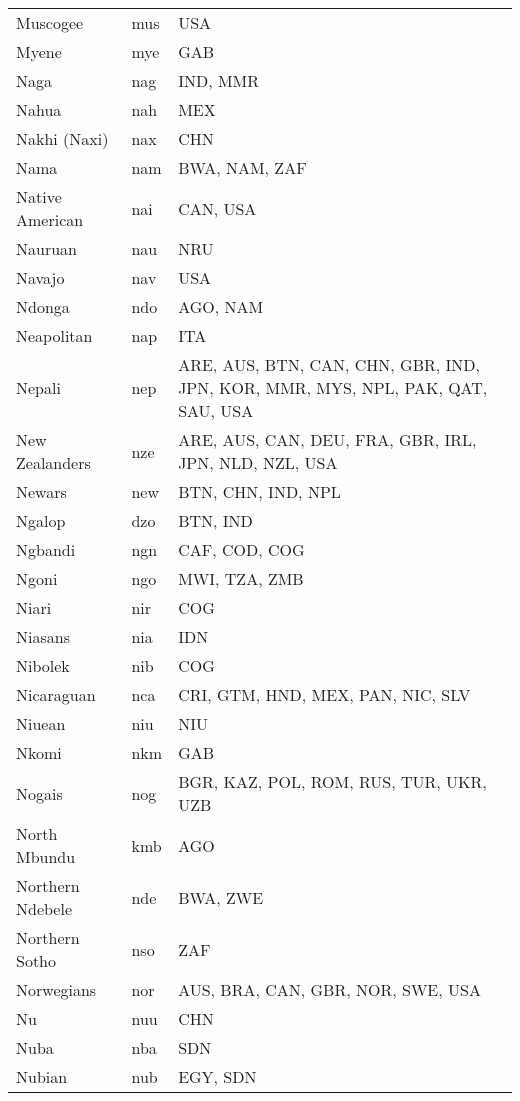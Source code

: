 \documentclass[12pt]{article}
\begin{document}
\begin{center}
\begin{longtable}{|p{7cm}|p{1cm}|p{7cm}|}
Muscogee	&	mus 	&	USA	\\	\cline{1-3}
Myene	&	mye	&	GAB	\\	\cline{1-3}
Naga	&	nag	&	IND, MMR	\\	\cline{1-3}
Nahua	&	nah 	&	MEX	\\	\cline{1-3}
Nakhi (Naxi)	&	nax	&	CHN	\\	\cline{1-3}
Nama	&	nam	&	BWA, NAM, ZAF	\\	\cline{1-3}
Native American	&	nai	&	CAN, USA	\\	\cline{1-3}
Nauruan	&	nau 	&	NRU	\\	\cline{1-3}
Navajo	&	nav 	&	USA	\\	\cline{1-3}
Ndonga	&	ndo 	&	AGO, NAM	\\	\cline{1-3}
Neapolitan	&	nap 	&	ITA	\\	\cline{1-3}
Nepali	&	nep 	&	ARE, AUS, BTN, CAN, CHN, GBR, IND, JPN, KOR, MMR, MYS, NPL, PAK, QAT, SAU, USA	\\	\cline{1-3}
New Zealanders	&	nze	&	ARE, AUS, CAN, DEU, FRA, GBR, IRL, JPN, NLD, NZL, USA	\\	\cline{1-3}
Newars	&	new 	&	BTN, CHN, IND, NPL	\\	\cline{1-3}
Ngalop	&	dzo 	&	BTN, IND	\\	\cline{1-3}
Ngbandi	&	ngn	&	CAF, COD, COG	\\	\cline{1-3}
Ngoni	&	ngo	&	MWI, TZA, ZMB	\\	\cline{1-3}
Niari	&	nir	&	COG	\\	\cline{1-3}
Niasans	&	nia 	&	IDN	\\	\cline{1-3}
Nibolek	&	nib	&	COG	\\	\cline{1-3}
Nicaraguan	&	nca	&	CRI, GTM, HND, MEX, PAN, NIC, SLV	\\	\cline{1-3}
Niuean	&	niu 	&	NIU	\\	\cline{1-3}
Nkomi	&	nkm	&	GAB	\\	\cline{1-3}
Nogais	&	nog 	&	BGR, KAZ, POL, ROM, RUS, TUR, UKR, UZB	\\	\cline{1-3}
North Mbundu	&	kmb 	&	AGO	\\	\cline{1-3}
Northern Ndebele	&	nde 	&	BWA, ZWE	\\	\cline{1-3}
Northern Sotho	&	nso 	&	ZAF	\\	\cline{1-3}
Norwegians	&	nor 	&	AUS, BRA, CAN, GBR, NOR, SWE, USA	\\	\cline{1-3}
Nu	&	nuu	&	CHN	\\	\cline{1-3}
Nuba	&	nba	&	SDN	\\	\cline{1-3}
Nubian	&	nub 	&	EGY, SDN	\\	\cline{1-3}

\end{longtable}
\end{center}
\end{document}
